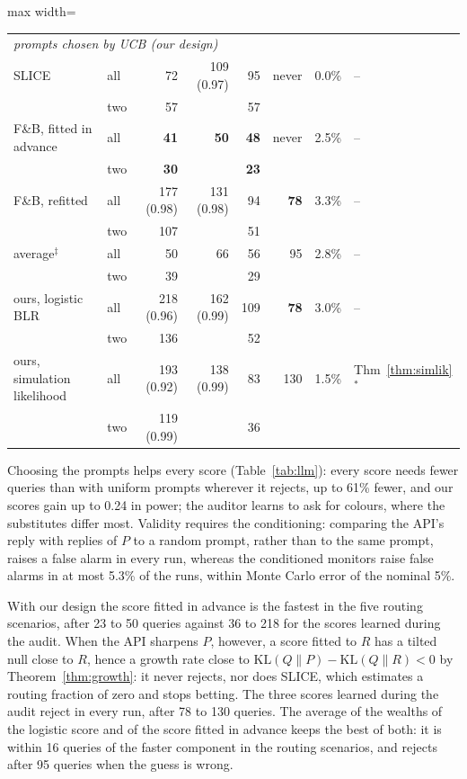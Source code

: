 \documentclass[12pt]{article}
\newcommand{\KL}{\mathrm{KL}}
\theoremstyle{remark}
\begin{document}
\begin{table}[tp]
\begin{adjustbox}{max width=\textwidth}
\begin{tabular}{llrrrrrl}
\midrule
\multicolumn{8}{l}{\emph{prompts chosen by UCB (our design)}} \\
SLICE & all & 72 & 109 (0.97) & 95 & never & 0.0\% & -- \\
 & two & 57 &  & 57 &  & & \\
\addlinespace[3pt]
F\&B, fitted in advance & all & \textbf{41} & \textbf{50} & \textbf{48} & never & 2.5\% & -- \\
 & two & \textbf{30} &  & \textbf{23} &  & & \\
\addlinespace[3pt]
F\&B, refitted & all & 177 (0.98) & 131 (0.98) & 94 & \textbf{78} & 3.3\% & -- \\
 & two & 107 &  & 51 &  & & \\
\addlinespace[3pt]
average$^\ddagger$ & all & 50 & 66 & 56 & 95 & 2.8\% & -- \\
 & two & 39 &  & 29 &  & & \\
\addlinespace[3pt]
ours, logistic BLR & all & 218 (0.96) & 162 (0.99) & 109 & \textbf{78} & 3.0\% & -- \\
 & two & 136 &  & 52 &  & & \\
\addlinespace[3pt]
ours, simulation likelihood & all & 193 (0.92) & 138 (0.99) & 83 & 130 & 1.5\% & Thm~\ref{thm:simlik}$^*$ \\
 & two & 119 (0.99) &  & 36 &  & & \\
\bottomrule
\end{tabular}
\end{adjustbox}
\end{table}

Choosing the prompts helps every score (Table~\ref{tab:llm}): every score needs fewer queries than with uniform prompts wherever it rejects, up to 61\% fewer, and our scores gain up to 0.24 in power; the auditor learns to ask for colours, where the substitutes differ most. Validity requires
the conditioning: comparing the API's reply with replies of $P$ to a random
prompt, rather than to the same prompt, raises a false alarm in every run,
whereas the conditioned monitors raise false alarms in at most 5.3\% of the
runs, within Monte Carlo error of the nominal 5\%.


With our design the score fitted in advance is the fastest in the five
routing scenarios, after 23 to 50 queries against 36 to 218 for the scores
learned during the audit. When the API sharpens $P$, however, a score fitted
to $R$ has a tilted null close to $R$, hence a growth rate close to
$\KL(Q\|P) - \KL(Q\|R) < 0$ by Theorem~\ref{thm:growth}: it never rejects,
nor does SLICE, which estimates a routing fraction of zero and stops betting.
The three scores learned during the audit reject in every run, after 78 to
130 queries. The average of the wealths of the logistic score and of the
score fitted in advance keeps the best of both: it is within 16 queries of
the faster component in the routing scenarios, and rejects after 95 queries
when the guess is wrong.
\end{document}
